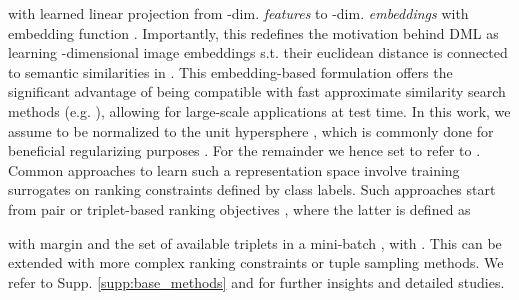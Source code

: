 \documentclass{article} \usepackage{arxiv_style,times}
\begin{document}
with learned linear projection  from -dim. \textit{features}  to -dim. \textit{embeddings}  with embedding function . Importantly, this redefines the motivation behind DML as learning -dimensional image embeddings  s.t. their euclidean distance  is connected to semantic similarities in . This embedding-based formulation offers the significant advantage of being compatible with fast approximate similarity search methods (e.g. \cite{faiss}), allowing for large-scale applications at test time.
In this work, we assume  to be normalized to the unit hypersphere , which is commonly done \citep{margin,Sanakoyeu_2019_CVPR,sphereface,wang2020understanding} for beneficial regularizing purposes \citep{margin,wang2020understanding}. 
For the remainder we hence set  to refer to .\\
Common approaches to learn such a representation space involve training surrogates on ranking constraints defined by class labels. Such approaches start from pair or triplet-based ranking objectives \citep{contrastive,semihard}, where the latter is defined as

with margin  and the set of available triplets  in a mini-batch , with .
This can be extended with more complex ranking constraints or tuple sampling methods. 
We refer to Supp. \ref{supp:base_methods} and \cite{roth2020revisiting} for further insights and detailed studies.
\end{document}
